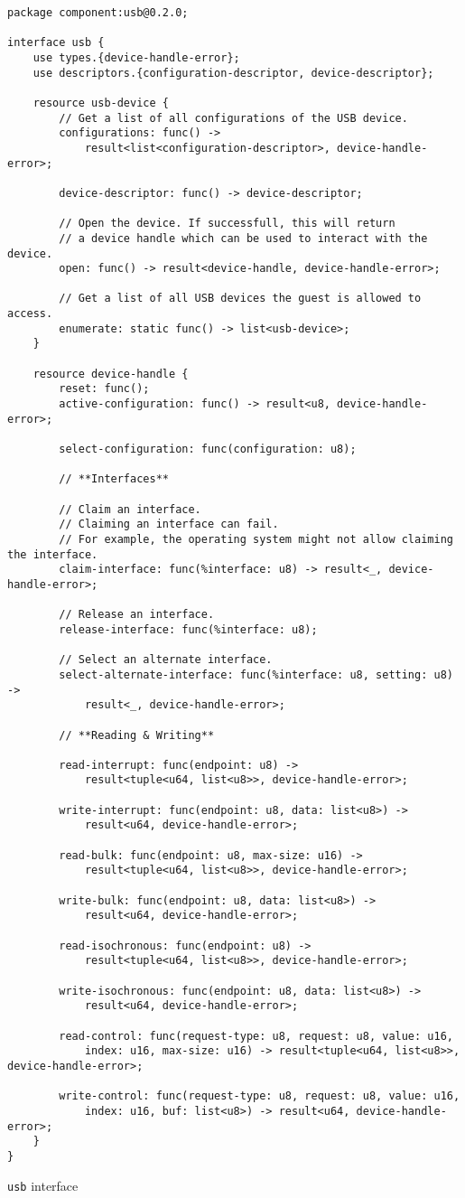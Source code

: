 \begin{code}
\begin{verbatim}
package component:usb@0.2.0;

interface usb {
	use types.{device-handle-error};
	use descriptors.{configuration-descriptor, device-descriptor};

	resource usb-device {
		// Get a list of all configurations of the USB device.
		configurations: func() -> 
			result<list<configuration-descriptor>, device-handle-error>;

		device-descriptor: func() -> device-descriptor;

		// Open the device. If successfull, this will return 
		// a device handle which can be used to interact with the device.
		open: func() -> result<device-handle, device-handle-error>;

		// Get a list of all USB devices the guest is allowed to access.
		enumerate: static func() -> list<usb-device>;
	}

	resource device-handle {
		reset: func();
		active-configuration: func() -> result<u8, device-handle-error>;

		select-configuration: func(configuration: u8);

		// **Interfaces**

		// Claim an interface.
		// Claiming an interface can fail.
		// For example, the operating system might not allow claiming the interface.
		claim-interface: func(%interface: u8) -> result<_, device-handle-error>;

		// Release an interface.
		release-interface: func(%interface: u8);

		// Select an alternate interface.
		select-alternate-interface: func(%interface: u8, setting: u8) -> 
			result<_, device-handle-error>;

		// **Reading & Writing**

		read-interrupt: func(endpoint: u8) -> 
			result<tuple<u64, list<u8>>, device-handle-error>;
			
		write-interrupt: func(endpoint: u8, data: list<u8>) -> 
			result<u64, device-handle-error>;

		read-bulk: func(endpoint: u8, max-size: u16) -> 
			result<tuple<u64, list<u8>>, device-handle-error>;
			
		write-bulk: func(endpoint: u8, data: list<u8>) -> 
			result<u64, device-handle-error>;

		read-isochronous: func(endpoint: u8) -> 
			result<tuple<u64, list<u8>>, device-handle-error>;
			
		write-isochronous: func(endpoint: u8, data: list<u8>) -> 
			result<u64, device-handle-error>;

		read-control: func(request-type: u8, request: u8, value: u16, 
			index: u16, max-size: u16) -> result<tuple<u64, list<u8>>, device-handle-error>;
			
		write-control: func(request-type: u8, request: u8, value: u16, 
			index: u16, buf: list<u8>) -> result<u64, device-handle-error>;
	}
}
\end{verbatim}
\caption{\texttt{usb} interface}
\label{code:usb_interface}
\end{code}

